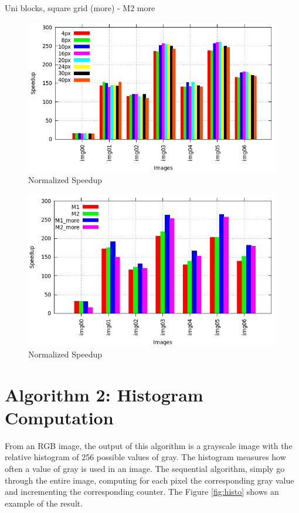 \documentclass[a4paper]{article}
\begin{document}
Uni blocks, square grid (more) - M2 more
\begin{figure}[ht]
    \centering
    \includegraphics[width=0.9\linewidth]{res/darker_square_more_histo}
    \caption{Normalized Speedup}
    \label{fig:norm_histo_darker}
\end{figure}
\FloatBarrier

\begin{figure}[ht]
    \centering
    \includegraphics[width=0.9\linewidth]{res/darker_best_comparison}
    \caption{Normalized Speedup}
    \label{fig:norm_histo_darker}
\end{figure}
\FloatBarrier

\section{Algorithm 2: Histogram Computation}
\label{sec:hc}
From an RGB image, the output of this algorithm is a grayscale image with the relative histogram of 256 possible values of gray.
The histogram measures how often a value of gray is used in an image. The sequential algorithm, simply go through the entire image, computing for each pixel the corresponding gray value and incrementing the corresponding counter. The Figure \ref{fig:histo} shows an example of the result.
\end{document}
